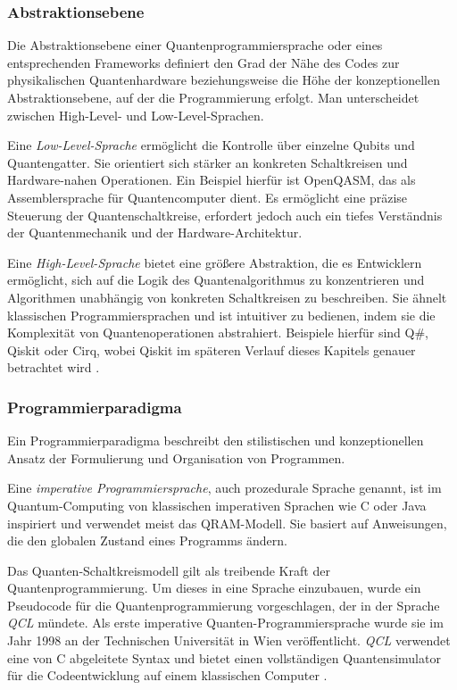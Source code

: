 \subsubsection*{Abstraktionsebene}

Die Abstraktionsebene einer Quantenprogrammiersprache oder eines entsprechenden Frameworks definiert den Grad der Nähe des Codes zur physikalischen Quantenhardware beziehungsweise die Höhe der konzeptionellen Abstraktionsebene, auf der die Programmierung erfolgt. Man unterscheidet zwischen High-Level- und Low-Level-Sprachen.

Eine \textit{Low-Level-Sprache} ermöglicht die Kontrolle über einzelne Qubits und Quantengatter. Sie orientiert sich stärker an konkreten Schaltkreisen und Hardware-nahen Operationen. Ein Beispiel hierfür ist OpenQASM, das als Assemblersprache für Quantencomputer dient. Es ermöglicht eine präzise Steuerung der Quantenschaltkreise, erfordert jedoch auch ein tiefes Verständnis der Quantenmechanik und der Hardware-Architektur. \autocite{cross_open_2017}

Eine \textit{High-Level-Sprache} bietet eine größere Abstraktion, die es Entwicklern ermöglicht, sich auf die Logik des Quantenalgorithmus zu konzentrieren und Algorithmen unabhängig von konkreten Schaltkreisen zu beschreiben. Sie ähnelt klassischen Programmiersprachen und ist intuitiver zu bedienen, indem sie die Komplexität von Quantenoperationen abstrahiert. Beispiele hierfür sind Q\#, Qiskit oder Cirq, wobei Qiskit im späteren Verlauf dieses Kapitels genauer betrachtet wird \autocite{singhSurveyAvailableTools2024a}.

\subsubsection*{Programmierparadigma}

Ein Programmierparadigma beschreibt den stilistischen und konzeptionellen Ansatz der Formulierung und Organisation von Programmen.

Eine \textit{imperative Programmiersprache}, auch prozedurale Sprache genannt, ist im Quantum-Computing von klassischen imperativen Sprachen wie C oder Java inspiriert und verwendet meist das QRAM-Modell. Sie basiert auf Anweisungen, die den globalen Zustand eines Programms ändern. \autocite{garhwal_quantum_2021}

Das Quanten-Schaltkreismodell gilt als treibende Kraft der Quantenprogrammierung. Um dieses in eine Sprache einzubauen, wurde ein Pseudocode für die Quantenprogrammierung vorgeschlagen, der in der Sprache \textit{QCL} mündete. Als erste imperative Quanten-Programmiersprache wurde sie im Jahr 1998 an der Technischen Universität in Wien veröffentlicht. \textit{QCL} verwendet eine von C abgeleitete Syntax und bietet einen vollständigen Quantensimulator für die Codeentwicklung auf einem klassischen Computer \autocite{sofgeSurveyQuantumProgramming2008a}.


